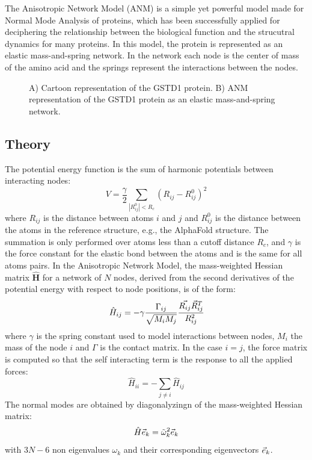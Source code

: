 The Anisotropic Network Model (ANM) is a simple yet powerful model made for Normal Mode Analysis of proteins, which has been successfully applied for deciphering the relationship between the biological function and the strucutral dynamics for many proteins\cite{ANM-COM}. In this model, the protein is represented as an elastic mass-and-spring network. In the network each node is the center of mass of the amino acid and the springs represent the interactions between the nodes. 

\begin{figure}[h!]
	\caption{A) Cartoon representation of the GSTD1 protein. B) ANM representation of the GSTD1 protein as an elastic mass-and-spring network.}	
	\label{FIG2}
\end{figure}

\subsection{Theory}

The potential energy function is the sum of harmonic potentials between interacting nodes:
\begin{equation}
	V=\dfrac{\gamma}{2}\sum_{|R_{ij}^0|<R_c}(R_{ij}-R_{ij}^0)^2
\end{equation}
where $R_{ij}$ is the distance between atoms $i$ and $j$ and $R_{ij}^0$ is the distance between the atoms in the reference structure, e.g., the AlphaFold structure. The summation is only performed over atoms less than a cutoff distance $R_c$, and $\gamma$ is the force constant for the elastic bond between the atoms and is the same for all atoms pairs. In the Anisotropic Network Model, the mass-weighted Hessian matrix $\mathbf{\widehat{H}}$ for a network of $N$ nodes, derived from the second derivatives of the potential energy with respect to node positions, is of the form:
\begin{equation}
	\label{mass-weighted hessian matrix}
	\hat{H}_{ij} = -\gamma\dfrac{\Gamma_{ij}}{\sqrt{M_iM_j}}\cfrac{\vec{R_{ij}}\vec{R}_ {ij}^T}{R^2_ {ij}}
\end{equation}
where $\gamma$ is the spring constant used to model interactions between nodes, $M_i$ the mass of the node $i$ and $\Gamma$ is the contact matrix. In the case $i = j$, the force matrix is computed so that the self interacting term is the response to all the applied forces:
\begin{equation}
	\label{self interacting terms}
	\hat{H}_{ii} = -\sum_{j \ne i}\hat{H}_{ij}
\end{equation}
The normal modes are obtained by diagonalyzingn of the mass-weighted Hessian matrix:
\begin{equation}
	\label{eigen equation}
	\hat{H}\vec{e}_k = \tilde{\omega}_k^2\vec{e}_k
\end{equation}
with $3N-6$ non eigenvalues $\omega_k$ and their corresponding eigenvectors $\vec{e}_k$.\\


